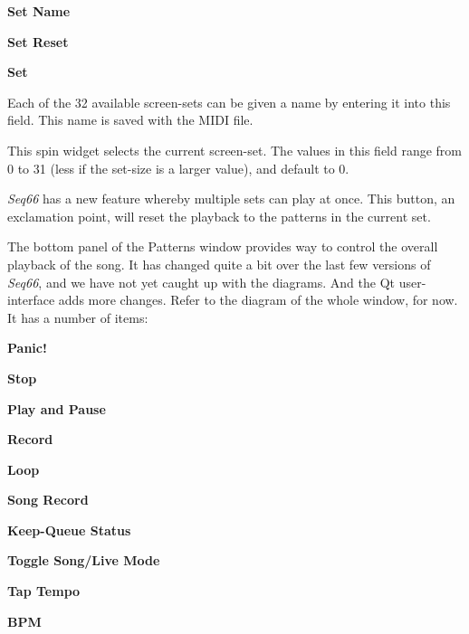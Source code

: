    \begin{enumber}
      \item \textbf{Set Name}
      \item \textbf{Set Reset}
      \item \textbf{Set}
   \end{enumber}

   \setcounter{ItemCounter}{0}      %

   Each of the 32 available screen-sets can be given a name by entering it
   into this field.  This name is saved with the MIDI file.

   This spin widget selects the current screen-set.  The values in this
   field range from 0 to 31 (less if the set-size is a larger value),
   and default to 0.

   \textsl{Seq66} has a new feature whereby multiple sets can play at once.
   This button, an exclamation point, will reset the playback to the patterns
   in the current set.

   The bottom panel of the Patterns window provides way to control the
   overall playback of the song.  It has changed quite a bit over the last few
   versions of \textsl{Seq66}, and we have not yet caught up with the
   diagrams. And the Qt user-interface adds more changes.
   Refer to the diagram of the whole window, for now.
   It has a number of items:

   \begin{enumber}
      \item \textbf{Panic!}
      \item \textbf{Stop}
      \item \textbf{Play and Pause}
      \item \textbf{Record}
      \item \textbf{Loop}
      \item \textbf{Song Record}
      \item \textbf{Keep-Queue Status}
      \item \textbf{Toggle Song/Live Mode}
      \item \textbf{Tap Tempo}
      \item \textbf{BPM}
   \end{enumber}

